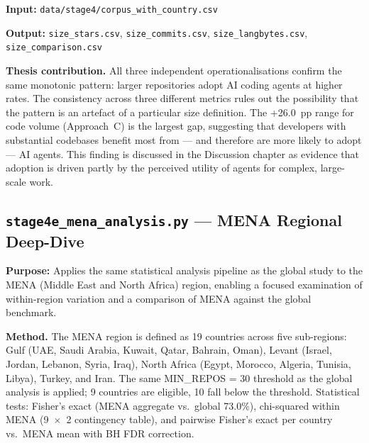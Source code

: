 \documentclass[11pt,a4paper]{article}
\begin{document}
\textbf{Input:} \texttt{data/stage4/corpus\_with\_country.csv}

\textbf{Output:} \texttt{size\_stars.csv}, \texttt{size\_commits.csv},
\texttt{size\_langbytes.csv}, \texttt{size\_comparison.csv}

\begin{outputbox}
\textbf{Thesis contribution.}
All three independent operationalisations confirm the same monotonic pattern:
larger repositories adopt AI coding agents at higher rates. The consistency
across three different metrics rules out the possibility that the pattern
is an artefact of a particular size definition. The +26.0~pp range for code
volume (Approach~C) is the largest gap, suggesting that developers with
substantial codebases benefit most from --- and therefore are more likely
to adopt --- AI agents. This finding is discussed in the Discussion chapter
as evidence that adoption is driven partly by the perceived utility of agents
for complex, large-scale work.
\end{outputbox}

\newpage

\subsection*{\texttt{stage4e\_mena\_analysis.py} --- MENA Regional Deep-Dive}

\begin{infobox}
\textbf{Purpose:} Applies the same statistical analysis pipeline as the global
study to the MENA (Middle East and North Africa) region, enabling a focused
examination of within-region variation and a comparison of MENA against the
global benchmark.
\end{infobox}

\textbf{Method.}
The MENA region is defined as 19 countries across five sub-regions:
Gulf (UAE, Saudi Arabia, Kuwait, Qatar, Bahrain, Oman),
Levant (Israel, Jordan, Lebanon, Syria, Iraq),
North Africa (Egypt, Morocco, Algeria, Tunisia, Libya),
Turkey, and Iran. The same MIN\_REPOS = 30 threshold as the global analysis
is applied; 9 countries are eligible, 10 fall below the threshold.
Statistical tests: Fisher's exact (MENA aggregate vs.\ global 73.0\%),
chi-squared within MENA (9~$\times$~2 contingency table), and pairwise
Fisher's exact per country vs.\ MENA mean with BH FDR correction.
\end{document}
